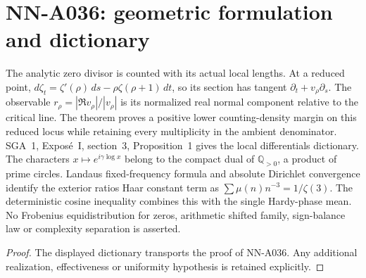 \section{NN-A036: geometric formulation and dictionary}
\begin{geometricstatement}[NN-A036]
The analytic zero divisor is counted with its actual local lengths. At a reduced point, $d\zeta_t=\zeta\prime(\rho)\,ds-\rho\zeta(\rho+1)\,dt$, so its section has tangent $\partial_t+v_\rho\partial_s$. The observable $r_\rho=|\Re v_\rho|/|v_\rho|$ is its normalized real normal component relative to the critical line. The theorem proves a positive lower counting-density margin on this reduced locus while retaining every multiplicity in the ambient denominator. SGA~1, Expos\'e~I, section~3, Proposition~1 gives the local differentials dictionary. The characters $x\mapsto e^{i\gamma\log x}$ belong to the compact dual of $\mathbb Q_{>0}$, a product of prime circles. Landau\textquotesingle s fixed-frequency formula and absolute Dirichlet convergence identify the exterior ratio\textquotesingle s Haar constant term as $\sum\mu(n)n^{-3}=1/\zeta(3)$. The deterministic cosine inequality combines this with the single Hardy-phase mean. No Frobenius equidistribution for zeros, arithmetic shifted family, sign-balance law or complexity separation is asserted.
\end{geometricstatement}
\begin{proof} The displayed dictionary transports the proof of NN-A036. Any additional realization, effectiveness or uniformity hypothesis is retained explicitly.\end{proof}


